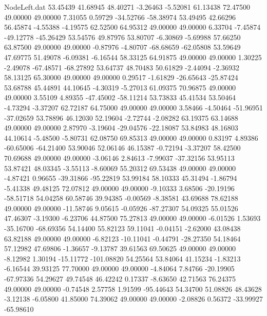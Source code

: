 \begin{filecontents}{NodeLeft.dat}
  53.45439   41.68945   48.40271    -3.26463   -5.52081   61.13438   72.47500   49.00000   49.00000    7.31055    0.59729  -34.52766  -58.38974
  53.49495   42.66296   56.45874    -4.55388   -4.19575   62.52500   64.95312   49.00000   49.00000    6.33704   -7.45874  -49.12778  -45.26429
  53.54576   49.87976   53.80707    -6.30869   -5.69988   57.66250   63.87500   49.00000   49.00000   -0.87976   -4.80707  -68.68659  -62.05808
  53.59649   47.69775   51.49078    -6.09381   -6.16544   58.33125   64.91875   49.00000   49.00000    1.30225   -2.49078  -67.48571  -68.27892
  53.64737   48.70483   50.61829    -2.44094   -2.36932   58.13125   65.30000   49.00000   49.00000    0.29517   -1.61829  -26.65643  -25.87424
  53.68788   45.44891   44.10645    -4.30319   -5.27013   61.09375   70.96875   49.00000   49.00000    3.55109    4.89355  -47.45002  -58.11214
  53.73833   45.41534   53.50464    -4.73294   -3.37207   62.72187   64.75000   49.00000   49.00000    3.58466   -4.50464  -51.96951  -37.02659
  53.78896   46.12030   52.19604    -2.72744   -2.08282   63.19375   63.14688   49.00000   49.00000    2.87970   -3.19604  -29.04576  -22.18087
  53.84983   48.16803   44.10614    -5.48500   -5.80731   62.08750   69.85313   49.00000   49.00000    0.83197    4.89386  -60.65006  -64.21400
  53.90046   52.06146   46.15387    -0.72194   -3.37207   58.42500   70.69688   49.00000   49.00000   -3.06146    2.84613   -7.99037  -37.32156
  53.95113   53.87421   48.03345    -3.55113   -8.60069   55.20312   69.53438   49.00000   49.00000   -4.87421    0.96655  -39.31866  -95.22819
  53.99184   58.10333   45.31494    -1.86794   -5.41338   49.48125   72.07812   49.00000   49.00000   -9.10333    3.68506  -20.19196  -58.51718
  54.04258   60.58746   39.94385    -0.00569   -8.38581   43.69688   78.62188   49.00000   49.00000  -11.58746    9.05615   -0.05926  -87.27307
  54.09325   55.01526   47.46307    -3.19300   -6.23706   44.87500   75.27813   49.00000   49.00000   -6.01526    1.53693  -35.16700  -68.69356
  54.14400   55.82123   59.11041    -0.04151   -2.62000   43.08438   63.82188   49.00000   49.00000   -6.82123  -10.11041   -0.44791  -28.27350
  54.18464   57.12982   47.69806    -1.36657   -9.13787   39.61563   69.50625   49.00000   49.00000   -8.12982    1.30194  -15.11772 -101.08820
  54.25564   53.84064   41.15234    -1.83213   -6.16544   39.93125   77.70000   49.00000   49.00000   -4.84064    7.84766  -20.19905  -67.97336
  54.29627   49.74548   46.42242     0.17337   -8.63650   42.71563   76.24375   49.00000   49.00000   -0.74548    2.57758    1.91599  -95.44643
  54.34700   51.08826   48.43628    -3.12138   -6.05800   41.85000   74.39062   49.00000   49.00000   -2.08826    0.56372  -33.99927  -65.98610

\end{filecontents}
